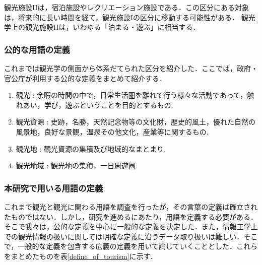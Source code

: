 \documentclass{jsarticle}
\begin{document}
観光施設IIは，宿泊施設やレクリエーション施設である．この区分にある対象は，将来的に長い時間を経て，観光施設Iの区分に移動する可能性がある．
観光学上の観光施設IIは，いわゆる「泊まる・遊ぶ」に相当する．


\subsubsection{公的な用語の定義}

これまでは観光学の側面から体系だてられた区分を紹介した．ここでは，政府・官公庁が利用する公的な定義をまとめて紹介する．

\begin{enumerate}
\item 観光      : 余暇の時間の中で，日常生活圏を離れて行う様々な活動であって，触れあい，学び，遊ぶということを目的とするもの\cite{toshin_1995}.
\item 観光資源  : 史跡，名勝，天然記念物等の文化財，歴史的風土，優れた自然の風景地，良好な景観，温泉その他文化，産業等に関するもの\cite{tourism_law_2007}.
\item 観光地    : 観光資源の集積及び地域的なまとまり\cite{tourism_kensetsu_1974}.
\item 観光地域  : 観光地の集積，一日周遊圏\cite{tourism_kensetsu_1974}.
\end{enumerate}

\subsubsection{本研究で用いる用語の定義}

これまで観光と観光に関わる用語を調査を行ったが，その言葉の定義は確立されたものではない．しかし，研究を進めるにあたり，用語を定義する必要がある．そこで我々は，公的な定義を中心に一般的な定義を決定した．また，情報工学上での観光情報の扱いに関しては明確な定義に沿うデータ取り扱いは難しい．そこで，一般的な定義を包含する広義の定義を用いて論じていくこととした．これらをまとめたものを表\ref{define_of_tourism}に示す．
\end{document}
